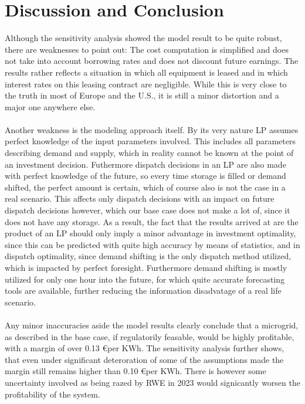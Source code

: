 \documentclass[
	11pt,								%
	DIV10,								%
	a4paper,         					%
	oneside,							%
	headheight=20pt,					%
	footheight=20pt,					%
    parskip=full,						%
    listof=totoc,						%
	bibliography=totoc,					%
	index=totoc,						%
]{scrartcl}
\begin{document}
 
\newpage
{}	
\section{Discussion and Conclusion}
Although the sensitivity analysis showed the model result to be quite robust, there are weaknesses to point out: The cost computation is simplified and does not take into account borrowing rates and does not discount future earnings. The results rather reflects a situation in which all equipment is leased and in which interest rates on this leasing contract are negligible. While this is very close to the truth in most of Europe and the U.S., it is still a minor distortion and a major one anywhere else.\\\\
Another weakness is the modeling approach itself. By its very nature LP assumes perfect knowledge of the input parameters involved. This includes all parameters describing demand and supply, which in reality cannot be known at the point of an investment decision. Futhermore dispatch decisions in an LP are also made with perfect knowledge of the future, so every time storage is filled or demand shifted, the perfect amount is certain, which of course also is not the case in a real scenario. This affects only dispatch decisions with an impact on future dispatch decisions however, which our base case does not make a lot of, since it does not have any storage. As a result, the fact that the results arrived at are the product of an LP should only imply a minor advantage in investment optimality, since this can be predicted with quite high accuracy by means of statistics, and in dispatch optimality, since demand shifting is the only dispatch method utilized, which is impacted by perfect foresight. Furthermore demand shifting is mostly utilized for only one hour into the future, for which quite accurate forecasting tools are available, further reducing the information disadvatage of a real life scenario.\\\\
Any minor inaccuracies aside the model results clearly conclude that a microgrid, as described in the base case, if regulatorily feasable, would be highly profitable, with a margin of over 0.13 \euro per KWh. The sensitivity analysis further shows, that even under significant deteroration of some of the assumptions made the margin still remains higher than 0.10 \euro per KWh. There is however some uncertainty involved as being razed by RWE in 2023 would signicantly worsen the profitability of the system. \\
\end{document}
